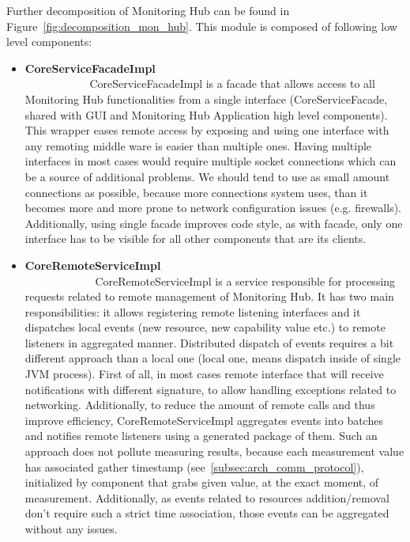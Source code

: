 Further decomposition of Monitoring Hub can be found in Figure~\ref{fig:decomposition_mon_hub}. This module is composed of following low level components:

\begin{itemize}

\item {\bf CoreServiceFacadeImpl}~~~~~~~~~~~~~~~~~~~~~~~~~~~~~~~~~~~~~~~~~~~~~~~~~~~~~~~~\linebreak
CoreServiceFacadeImpl is a facade that allows access to all Monitoring Hub functionalities from a single interface (CoreServiceFacade, shared with GUI and Monitoring Hub Application high level components). This wrapper eases remote access by exposing and using one interface with any remoting middle ware is easier than multiple ones. Having multiple interfaces in most cases would require multiple socket connections which can be a source of additional problems. We should tend to use as small amount connections as possible, because more connections system uses, than it becomes more and more prone to network configuration issues (e.g. firewalls). Additionally, using single facade improves code style, as with facade, only one interface has to be visible for all other components that are its clients.

\item {\bf CoreRemoteServiceImpl}~~~~~~~~~~~~~~~~~~~~~~~~~~~~~~~~~~~~~~~~~~~~~~~~~~~~~~~~\linebreak
CoreRemoteServiceImpl is a service responsible for processing requests related to remote management of Monitoring Hub. It has two main responsibilities: it allows registering remote listening interfaces and it dispatches local events (new resource, new capability value etc.) to remote listeners in aggregated manner. Distributed dispatch of events requires a bit different approach than a local one (local one, means dispatch inside of single JVM process). First of all, in most cases remote interface that will receive notifications with different signature, to allow handling exceptions related to networking. Additionally, to reduce the amount of remote calls and thus improve efficiency, CoreRemoteServiceImpl aggregates events into batches and notifies remote listeners using a generated package of them. Such an approach does not pollute measuring results, because each measurement value has associated gather timestamp (see~\ref{subsec:arch_comm_protocol}), initialized by component that grabs given value, at the exact moment, of measurement. Additionally, as events related to resources addition/removal don\rq{}t require such a strict time association, those events can be aggregated without any issues.


\end{itemize}
